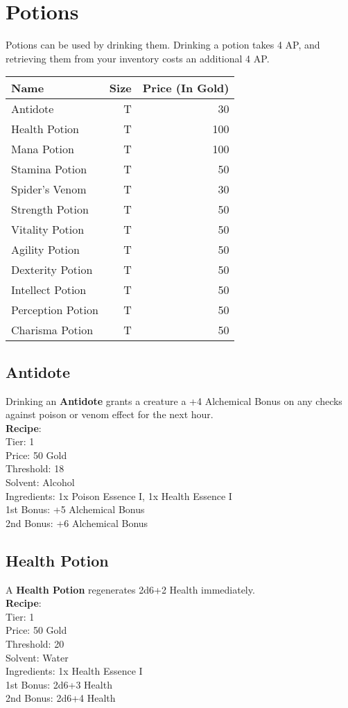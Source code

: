 \section{Potions}\label{sec:potions}
Potions can be used by drinking them.
Drinking a potion takes 4 AP, and retrieving them from your inventory costs an additional 4 AP.

\begin{longtable}{l | r | r}
	Name & Size & Price (In Gold)\\ \hline
	Antidote & T & 30\\
	Health Potion & T & 100\\
	Mana Potion & T & 100\\
	Stamina Potion & T & 50\\
	Spider's Venom & T & 30\\
	Strength Potion & T & 50\\
	Vitality Potion & T & 50\\
	Agility Potion & T & 50\\
	Dexterity Potion & T & 50\\
	Intellect Potion & T & 50\\
	Perception Potion & T & 50\\
	Charisma Potion & T & 50\\
\end{longtable}

\subsection{Antidote}\label{potion:antidote}
Drinking an \textbf{Antidote} grants a creature a +4 Alchemical Bonus on any checks against poison or venom effect for the next hour.\\
\textbf{Recipe}:\\
Tier: 1\\
Price: 50 Gold \\
Threshold: 18\\
Solvent: Alcohol\\
Ingredients: 1x Poison Essence I, 1x Health Essence I\\
1st Bonus: +5 Alchemical Bonus\\
2nd Bonus: +6 Alchemical Bonus\\

\subsection{Health Potion}\label{potion:healthPotion}
A \textbf{Health Potion} regenerates 2d6+2 Health immediately.\\
\textbf{Recipe}:\\
Tier: 1\\
Price: 50 Gold\\
Threshold: 20\\
Solvent: Water\\
Ingredients: 1x Health Essence I\\
1st Bonus: 2d6+3 Health\\
2nd Bonus: 2d6+4 Health\\

